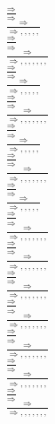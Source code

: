 \documentclass[11pt]{article}
\begin{document}
\begin{center}
\\$\frac{\Rightarrow }{\Rightarrow }$
\bigskip
\\$\frac{\Rightarrow }{\Rightarrow , , , , , }$
\bigskip
\\$\frac{\Rightarrow }{\Rightarrow }$
\bigskip
\\$\frac{\Rightarrow }{\Rightarrow , , , , , , , }$
\bigskip
\\$\frac{\Rightarrow }{\Rightarrow }$
\bigskip
\\$\frac{\Rightarrow }{\Rightarrow , , , , , }$
\bigskip
\\$\frac{\Rightarrow }{\Rightarrow }$
\bigskip
\\$\frac{\Rightarrow }{\Rightarrow , , , , , , , }$
\bigskip
\\$\frac{\Rightarrow }{\Rightarrow }$
\bigskip
\\$\frac{\Rightarrow }{\Rightarrow , , , , , }$
\bigskip
\\$\frac{\Rightarrow }{\Rightarrow }$
\bigskip
\\$\frac{\Rightarrow }{\Rightarrow , , , , , , , }$
\bigskip
\\$\frac{\Rightarrow }{\Rightarrow }$
\bigskip
\\$\frac{\Rightarrow }{\Rightarrow , , , , , }$
\bigskip
\\$\frac{\Rightarrow }{\Rightarrow }$
\bigskip
\\$\frac{\Rightarrow }{\Rightarrow , , , , , , , }$
\bigskip
\\$\frac{\Rightarrow }{\Rightarrow }$
\bigskip
\\$\frac{\Rightarrow }{\Rightarrow , , , , , , , }$
\bigskip
\\$\frac{\Rightarrow }{\Rightarrow }$
\bigskip
\\$\frac{\Rightarrow }{\Rightarrow , , , , , , , }$
\bigskip
\\$\frac{\Rightarrow }{\Rightarrow }$
\bigskip
\\$\frac{\Rightarrow }{\Rightarrow , , , , , , , }$
\bigskip
\\$\frac{\Rightarrow }{\Rightarrow }$
\bigskip
\\$\frac{\Rightarrow }{\Rightarrow , , , , , , , }$
\bigskip
\\$\frac{\Rightarrow }{\Rightarrow }$
\bigskip
\\$\frac{\Rightarrow }{\Rightarrow , , , , , , , }$
\bigskip
\\$\frac{\Rightarrow }{\Rightarrow }$
\bigskip
\\$\frac{\Rightarrow }{\Rightarrow , , , , , , , }$

\end{center}
\end{document}
